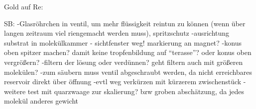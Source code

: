 Gold auf Re:





SB:
-Glasröhrchen in ventil, um mehr flüssigkeit reintun zu können (wenn über langen zeitraum viel riengemacht
werden muss), spritzschutz
-ausrichtung substrat in molekülkammer - sichtfenster weg! markierung an magnet?
-konus oben spitzer machen? damit keine tropfenbildung auf "`terasse"'? oder konus oben vergrößern?
-filtern der lösung oder verdünnen? geht filtern auch mit größeren molekülen?
-zum säubern muss ventil abgeschraubt werden, da nicht erreichbares reservoir direkt über öffnung
-evtl weg verkürzen mit kürzerem zwischenstück
-weitere test mit quarzwaage zur skalierung? bzw groben abschätzung, da jedes molekül anderes
gewicht
